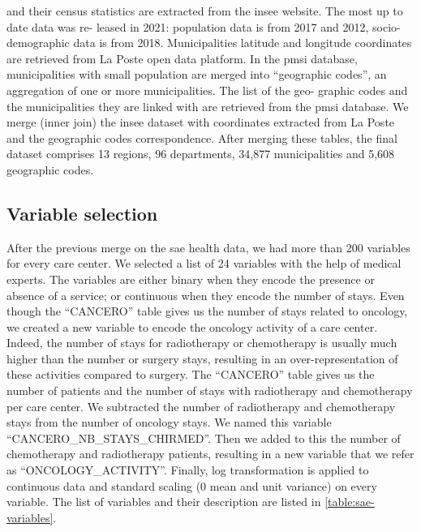 and their census statistics are extracted from the \ac{insee} website. The most
up to date data was re- leased in 2021: population data is from 2017 and 2012,
socio-demographic data is from 2018. Municipalities latitude and longitude
coordinates are retrieved from La Poste open data platform. In the \ac{pmsi}
database, municipalities with small population are merged into ``geographic
codes'', an aggregation of one or more municipalities. The list of the geo-
graphic codes and the municipalities they are linked with are retrieved from the
\ac{pmsi} database. We merge (inner join) the \ac{insee} dataset with
coordinates extracted from La Poste and the geographic codes correspondence.
After merging these tables, the final dataset comprises 13 regions, 96
departments, 34,877 municipalities and 5,608 geographic codes.

\subsection{Variable selection}

After the previous merge on the \ac{sae} health data, we had more than 200
variables for every care center. We selected a list of 24 variables with the
help of medical experts. The variables are either binary when they encode the
presence or absence of a service; or continuous when they encode the number of
stays. Even though the ``CANCERO'' table gives us the number of stays related to
oncology, we created a new variable to encode the oncology activity of a care
center. Indeed, the number of stays for radiotherapy or chemotherapy is usually
much higher than the number or surgery stays, resulting in an
over-representation of these activities compared to surgery. The ``CANCERO''
table gives us the number of patients and the number of stays with radiotherapy
and chemotherapy per care center. We subtracted the number of radiotherapy and
chemotherapy stays from the number of oncology stays. We named this variable
``CANCERO\_NB\_STAYS\_CHIRMED''. Then we added to this the number of
chemotherapy and radiotherapy patients, resulting in a new variable that we
refer as ``ONCOLOGY\_ACTIVITY''. Finally, log transformation is applied to
continuous data and standard scaling (0 mean and unit variance) on every
variable. The list of variables and their description are listed in
\cref{table:sae-variables}.

